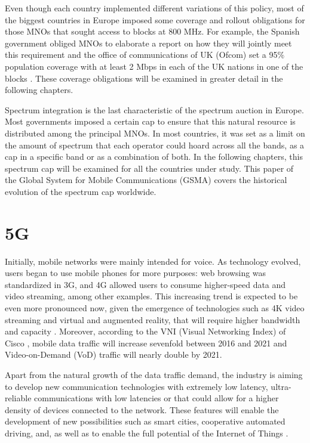 Even though each country implemented different variations of this policy, most of the biggest countries in Europe imposed some coverage and rollout obligations for those MNOs that sought access to blocks at 800 MHz. For example, the Spanish government obliged MNOs to elaborate a report on how they will jointly meet this requirement \cite{1-10} and the office of communications of UK (Ofcom) set a 95$\%$  population coverage with at least 2 Mbps in each of the UK nations in one of the blocks \cite{1-11}. These coverage obligations will be examined in greater detail in the following chapters.\par

Spectrum integration is the last characteristic of the spectrum auction in Europe. Most governments imposed a certain cap to ensure that this natural resource is distributed among the principal MNOs. In most countries, it was set as a limit on the amount of spectrum that each operator could hoard across all the bands, as a cap in a specific band or as a combination of both. In the following chapters, this spectrum cap will be examined for all the countries under study. This paper of the Global System for Mobile Communications (GSMA) \cite{1-11} covers the historical evolution of the spectrum cap worldwide.\par

\section{5G}
Initially, mobile networks were mainly intended for voice. As technology evolved, users began to use mobile phones for more purposes: web browsing was standardized in 3G, and 4G allowed users to consume higher-speed data and video streaming, among other examples. This increasing trend is expected to be even more pronounced now, given the emergence of technologies such as 4K video streaming and virtual and augmented reality, that will require higher bandwidth and capacity \cite{1-14}. Moreover, according to the VNI (Visual Networking Index) of Cisco \cite{1-15}, mobile data traffic will increase sevenfold between 2016 and 2021 and Video-on-Demand (VoD) traffic will nearly double by 2021.\par

Apart from the natural growth of the data traffic demand, the industry is aiming to develop new communication technologies with extremely low latency, ultra-reliable communications with low latencies or that could allow for a higher density of devices connected to the network. These features will enable the development of new possibilities such as smart cities, cooperative automated driving, and, as well as to enable the full potential of the Internet of Things \cite{1-16}.\par

